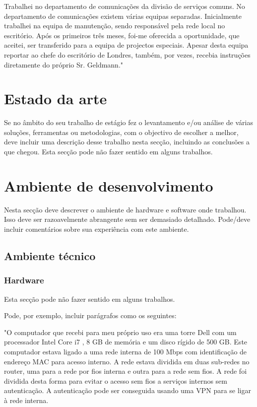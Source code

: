 \documentclass{article}
\begin{document}
Trabalhei no departamento de comunicações da divisão de serviços comuns. No departamento de comunicações existem várias equipas separadas. Inicialmente trabalhei na equipa de manutenção, sendo responsável pela rede local no escritório. Após os primeiros três meses, foi-me oferecida a oportunidade, que aceitei, ser transferido  para a equipa de projectos especiais. Apesar desta equipa reportar ao chefe do escritório de Londres, também, por vezes, recebia instruções diretamente do próprio Sr. Geldmann."


\cleardoublepage
\section{Estado da arte}
\label{sec:est-art}
Se no âmbito do seu trabalho de estágio fez o levantamento e/ou análise de várias soluções, ferramentas ou metodologias, com o objectivo de escolher a melhor, deve incluir uma descrição desse trabalho nesta secção, incluindo as conclusões a que chegou.
Esta secção pode não fazer sentido em alguns trabalhos.


\cleardoublepage
\section{Ambiente de desenvolvimento}
\label{sec:amb-dev}
Nesta secção deve descrever o ambiente de hardware e software onde trabalhou. Isso deve ser razoavelmente abrangente sem ser demasiado detalhado. Pode/deve incluir comentários sobre sua experiência com este ambiente.

\subsection{Ambiente técnico}
\subsubsection{Hardware}
Esta secção pode não fazer sentido em alguns trabalhos.

Pode, por exemplo, incluir parágrafos como os seguintes:

"O computador que recebi para meu próprio uso era uma torre Dell com um processador Intel Core i7 , 8 GB de memória e um disco rígido de 500 GB. Este computador estava ligado a uma rede interna de 100 Mbps com identificação de endereço MAC para acesso interno. A rede estava dividida em duas sub-redes no router, uma para a rede por fios interna e outra para a rede sem fios. A rede foi dividida desta forma para evitar o acesso sem fios a serviços internos sem autenticação. A autenticação pode ser conseguida usando uma VPN para se ligar à rede interna.
\end{document}
